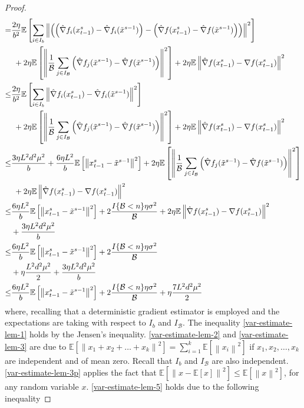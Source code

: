\documentclass{article}
\newcommand*{\E}{\mathbb{E}}
\newcommand{\norm}[1]{\left\lVert#1\right\rVert}
\theoremstyle{definition}
\theoremstyle{remark}
\begin{document}
\begin{proof}
\begin{align}
   = &\notag\frac{2\eta}{b^2}\E\left[\sum_{i\in I_b}\norm{\left(\left(\hat{\nabla} f_i(x_{t-1}^s)-\hat{\nabla} f_i(\tilde{x}^{s-1})\right) - \left({\hat{\nabla}} f(x_{t-1}^s) - \hat{\nabla} f(\tilde{x}^{s-1}) \right)\right)}^2\right]\\
   &\,\, \label{var-estimate-lem-3}+ 2\eta \E \left[ \norm{\frac{1}{\mathcal{B}}\sum_{j\in I_{\mathcal{B}}}\left(\hat{\nabla} f_j(\tilde{x}^{s-1}) - \hat{\nabla} f(\tilde{x}^{s-1})\right)}^2\right]+2\eta \E \norm{\hat{\nabla} f(x_{t-1}^s)-\nabla f(x_{t-1}^s)}^2\\
   \leq &\notag\frac{2\eta}{b^2}\E\left[\sum_{i\in I_b}\norm{\hat{\nabla} f_i(x_{t-1}^s)-\hat{\nabla} f_i(\tilde{x}^{s-1}) }^2\right]\\
   &\,\, \label{var-estimate-lem-3p}+ 2\eta \E \left[ \norm{\frac{1}{\mathcal{B}}\sum_{j\in I_{\mathcal{B}}}\left(\hat{\nabla} f_j(\tilde{x}^{s-1}) - \hat{\nabla} f(\tilde{x}^{s-1})\right)}^2\right]+2\eta \E \norm{\hat{\nabla} f(x_{t-1}^s)-\nabla f(x_{t-1}^s)}^2\\
   \leq  &\frac{3 \eta L^2 d^2 \mu^2}{b} + \frac{6\eta L^2}{b}\E\left[\norm{x_{t-1}^s-\tilde{x}^{s-1}}^2\right]+ 2\eta \E \left[ \norm{\frac{1}{\mathcal{B}}\sum_{j\in I_{\mathcal{B}}}\left(\hat{\nabla} f_j(\tilde{x}^{s-1}) - \hat{\nabla} f(\tilde{x}^{s-1})\right)}^2\right]\notag\\
   &\,\,\label{var-estimate-lem-5}+2\eta \E \norm{\hat{\nabla} f(x_{t-1}^s)-\nabla f(x_{t-1}^s)}^2\\
   \leq  &\frac{6\eta L^2}{b}\E\left[\norm{x_{t-1}^s-\tilde{x}^{s-1}}^2\right]+ 2\frac{I\{\mathcal{B} < n\}\eta \sigma ^2}{\mathcal{B}}+2\eta \E \norm{\hat{\nabla} f(x_{t-1}^s)-\nabla f(x_{t-1}^s)}^2\notag\\
   & \label{var-estimate-lem-6}+ \frac{3 \eta L^2 d^2 \mu^2}{b}\\
   \leq  &\label{var-estimate-lem-7}\frac{6\eta L^2}{b}\E\left[\norm{x_{t-1}^s-\tilde{x}^{s-1}}^2\right]+ 2\frac{I\{\mathcal{B} < n\}\eta \sigma ^2}{\mathcal{B}}\notag\\
   & +\eta \frac{L^2d^2\mu^2}{2}+ \frac{3 \eta L^2 d^2 \mu^2}{b}\\
   \leq  &\frac{6\eta L^2}{b}\E\left[\norm{x_{t-1}^s-\tilde{x}^{s-1}}^2\right]+ 2\frac{I\{\mathcal{B} < n\}\eta \sigma ^2}{\mathcal{B}}+\eta \frac{7L^2 d^2 \mu^2}{2} 
 \end{align}
 where, recalling that a deterministic gradient estimator is employed and the expectations are taking with respect to $I_b$ and $I_{\mathcal{B}}$. The inequality \eqref{var-estimate-lem-1} holds by the Jensen’s inequality. \eqref{var-estimate-lem-2} and \eqref{var-estimate-lem-3} are due to $\E[\norm{x_1+x_2+\ldots+x_k}^2] = \sum_{i=1}^k \E[\norm{x_i}^2]$ if $x_1,x_2,\ldots,x_k$ are independent and of mean zero. Recall that $I_b$ and $I_{\mathcal{B}}$ are also independent. \eqref{var-estimate-lem-3p} applies the fact that $\E[\norm{x-\E[x]}^2] \leq \E[\norm{x}^2]$, for any random variable $x$. \eqref{var-estimate-lem-5} holds due to the following inequality  

\end{proof}
\end{document}
